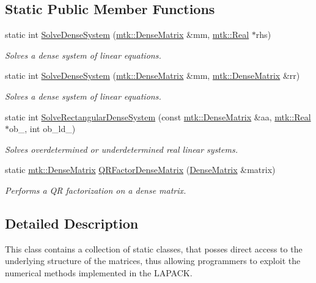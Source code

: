 \subsection*{Static Public Member Functions}
\begin{DoxyCompactItemize}
\item 
static int \hyperlink{classmtk_1_1LAPACKAdapter_a7428bccf74fd4a4af68fb7233846da22}{Solve\-Dense\-System} (\hyperlink{classmtk_1_1DenseMatrix}{mtk\-::\-Dense\-Matrix} \&mm, \hyperlink{group__c01-roots_gac080bbbf5cbb5502c9f00405f894857d}{mtk\-::\-Real} $\ast$rhs)
\begin{DoxyCompactList}\small\item\em Solves a dense system of linear equations. \end{DoxyCompactList}\item 
static int \hyperlink{classmtk_1_1LAPACKAdapter_af0723bba1d73450119d093b9cf1ff6f0}{Solve\-Dense\-System} (\hyperlink{classmtk_1_1DenseMatrix}{mtk\-::\-Dense\-Matrix} \&mm, \hyperlink{classmtk_1_1DenseMatrix}{mtk\-::\-Dense\-Matrix} \&rr)
\begin{DoxyCompactList}\small\item\em Solves a dense system of linear equations. \end{DoxyCompactList}\item 
static int \hyperlink{classmtk_1_1LAPACKAdapter_a380f148ffdf96bae2f79ae28f1a6560c}{Solve\-Rectangular\-Dense\-System} (const \hyperlink{classmtk_1_1DenseMatrix}{mtk\-::\-Dense\-Matrix} \&aa, \hyperlink{group__c01-roots_gac080bbbf5cbb5502c9f00405f894857d}{mtk\-::\-Real} $\ast$ob\-\_\-, int ob\-\_\-ld\-\_\-)
\begin{DoxyCompactList}\small\item\em Solves overdetermined or underdetermined real linear systems. \end{DoxyCompactList}\item 
static \hyperlink{classmtk_1_1DenseMatrix}{mtk\-::\-Dense\-Matrix} \hyperlink{classmtk_1_1LAPACKAdapter_ae5c6e78c9c819c9ac7a6f31bfd011d7a}{Q\-R\-Factor\-Dense\-Matrix} (\hyperlink{classmtk_1_1DenseMatrix}{Dense\-Matrix} \&matrix)
\begin{DoxyCompactList}\small\item\em Performs a Q\-R factorization on a dense matrix. \end{DoxyCompactList}\end{DoxyCompactItemize}


\subsection{Detailed Description}
This class contains a collection of static classes, that posses direct access to the underlying structure of the matrices, thus allowing programmers to exploit the numerical methods implemented in the L\-A\-P\-A\-C\-K.

